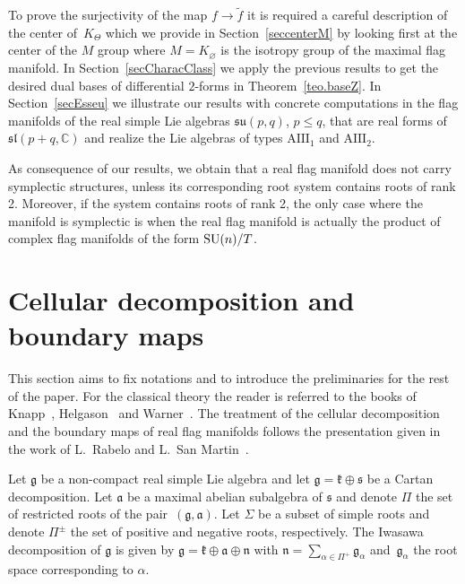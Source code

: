 \documentclass[10pt,a4paper]{amsart}
\numberwithin{equation}{section}
\begin{document}
To prove the surjectivity of the map $f\rightarrow \widetilde{f}$ it is required a careful description of the center of~$K_{\Theta }$ which we provide in Section~\ref{seccenterM} by looking first at the center of the $M$ group where $M=K_{\varnothing }$ is the isotropy group of the maximal flag manifold. In Section~\ref{secCharacClass} we apply the previous results to get the desired dual bases of differential $2$-forms in Theorem~\ref{teo.baseZ}. In Section~\ref{secEsseu} we illustrate our results with concrete computations in the flag manifolds of the real simple Lie algebras $\mathfrak{su}(p,q) $, $p\leq q$, that are real forms of $\mathfrak{sl} ( p+q,\mathbb{C} ) $ and realize the Lie algebras of types $\mathrm{AIII}_{1}$ and $\mathrm{AIII}_{2}$.

As consequence of our results, we obtain that a real flag manifold does not carry symplectic structures, unless its corresponding root system contains roots of rank 2. Moreover, if the system contains roots of rank 2, the only case where the manifold is symplectic is when the real flag manifold is actually the product of complex flag manifolds of the form ${\rm SU}(n)/T$.

\section{Cellular decomposition and boundary maps}\label{section2}

This section aims to fix notations and to introduce the preliminaries for the rest of the paper. For the classical theory the reader is referred to the books of Knapp~\cite{knapp}, Helgason~\cite{He} and Warner~\cite{WarG}. The treatment of the cellular decomposition and the boundary maps of real flag manifolds follows the presentation given in the work of L.~Rabelo and L.~San Martin~\cite{RSM}.

Let $\mathfrak{g }$ be a non-compact real simple Lie algebra and let $\mathfrak{g }=\mathfrak{k }\oplus\mathfrak{s }$ be a Cartan decomposition. Let $\mathfrak{a }$ be a maximal abelian subalgebra of $\mathfrak{s }$ and denote $\Pi$ the set of restricted roots of the pair~$(\mathfrak{g },\mathfrak{a })$. Let $\Sigma$ be a subset of simple roots and denote $\Pi^{\pm}$ the set of positive and negative roots, respectively. The Iwasawa decomposition of $\mathfrak{g }$ is given by $\mathfrak{g }=\mathfrak{k }\oplus\mathfrak{a }\oplus\mathfrak{n }$ with $\mathfrak{n }=\sum\limits_{\alpha\in\Pi^+}\mathfrak{g }_\alpha$ and~$\mathfrak{g}_\alpha$ the
root space corresponding to $\alpha$.
\end{document}
